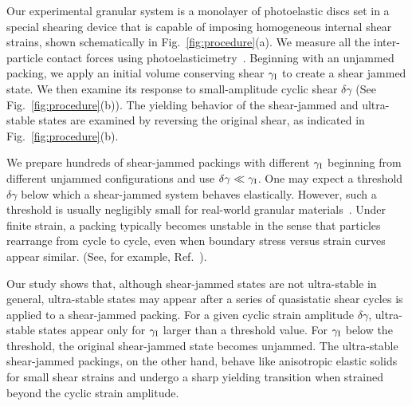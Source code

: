 \documentclass[twocolumn,showkeys,superscriptaddress,preprintnumbers,amsmath,amssymb,showpacs,prx,longbibliography]{revtex4-2}
\begin{document}
\begin{CJK*}{UTF8}{gbsn}
Our experimental granular system is a monolayer of photoelastic discs set in a special shearing device that is capable of imposing homogeneous internal shear
strains, shown schematically in Fig.~\ref{fig:procedure}(a). We measure all the inter-particle contact forces using photoelasticimetry~\cite{majmudar2005_nature,Daniels2017_rsi,zadeh2019_gm}. Beginning with an unjammed packing, we apply an initial volume conserving shear $\gamma_{\rm I}$ to create a shear jammed state.
We then examine its response to small-amplitude cyclic shear $\delta\gamma$ (See Fig.~\ref{fig:procedure}(b)). The yielding behavior of the shear-jammed and ultra-stable states are examined by reversing the original shear, as indicated in Fig.~\ref{fig:procedure}(b).

We prepare hundreds of shear-jammed packings with different $\gamma_{\rm I}$  beginning from different unjammed configurations and use $\delta\gamma \ll \gamma_{\rm I}$. One may expect a threshold $\delta\gamma$ below which a shear-jammed system behaves elastically. However, such a threshold is usually negligibly small for real-world granular materials~\cite{andreotti_forterre_pouliquen_2013}. 
Under finite strain, a packing typically becomes unstable in the sense that particles rearrange from cycle to cycle, even when boundary stress versus strain curves appear similar. (See, for example, Ref.~\cite{ren2013_thesis}).

Our study shows that, although shear-jammed states are not ultra-stable in general, ultra-stable states may appear after %
{\color{black} a series of}
quasistatic shear cycles is applied to a shear-jammed packing. For a given cyclic strain amplitude $\delta\gamma$, ultra-stable states appear only for  $\gamma_{\rm I}$ larger than a threshold value. For $\gamma_{\rm I}$ below the threshold, the original shear-jammed state becomes unjammed. The ultra-stable shear-jammed packings, on the other hand, behave like anisotropic elastic solids for small shear strains and undergo a sharp yielding transition when strained beyond the cyclic strain amplitude. 





\end{CJK*}
\end{document}
